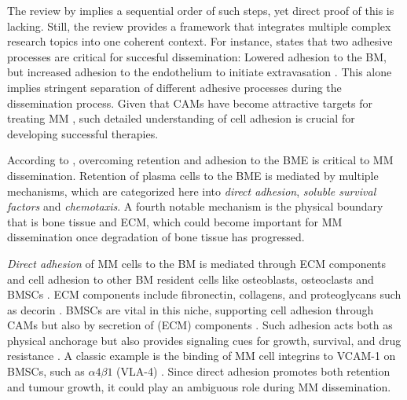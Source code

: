 The review by \citet{zeissigTumourDisseminationMultiple2020} implies a
sequential order of such steps, yet direct proof of this is lacking. Still, the
review provides a framework that integrates multiple complex research topics
into one coherent context. For instance,
\citet{zeissigTumourDisseminationMultiple2020} states that two adhesive
processes are critical for succesful dissemination: Lowered adhesion to the \ac{BM},
but increased adhesion to the endothelium to initiate extravasation
\cite{asosinghUniquePathwayHoming2001a,
    mrozikTherapeuticTargetingNcadherin2015}. This alone implies stringent
separation of different adhesive processes during the dissemination process.
Given that \acp{CAM} have become attractive targets for
treating \ac{MM} \cite{bouzerdanAdhesionMoleculesMultiple2022,
    katzAdhesionMoleculesLifelines2010}, such detailed understanding of cell
adhesion is crucial for developing successful therapies.


%
\label{sec:intro_myeloma_retention}%
According to \citet{zeissigTumourDisseminationMultiple2020}, overcoming
retention and adhesion to the BME is critical to \ac{MM} dissemination. Retention of
plasma cells to the BME is mediated by multiple mechanisms, which are
categorized here into \emph{direct adhesion}, \emph{soluble survival factors}
and \emph{chemotaxis}. A fourth notable mechanism is the physical boundary that
is bone tissue and \ac{ECM}, which could become important for
\ac{MM} dissemination once degradation of bone tissue has progressed.

\emph{Direct adhesion} of \ac{MM} cells to the \ac{BM} is mediated through
\ac{ECM} components and cell adhesion to other \ac{BM} resident cells like
osteoblasts, osteoclasts and \acp{BMSC} \cite{teohINTERACTIONTUMORHOST1997,
    bouzerdanAdhesionMoleculesMultiple2022}. \ac{ECM} components include
fibronectin, collagens, and proteoglycans such as decorin
\cite{huDecorinmediatedSuppressionTumorigenesis2021,
    huangHigherDecorinLevels2015, katzAdhesionMoleculesLifelines2010,
    kiblerAdhesiveInteractionsHuman1998}. \acp{BMSC} are vital in this niche,
supporting cell adhesion through \acp{CAM} but also by secretion of (\ac{ECM})
components \cite{katzAdhesionMoleculesLifelines2010}. Such adhesion acts both as
physical anchorage but also provides signaling cues for growth, survival, and
drug resistance \cite{chenContributionBoneMarrow2020}. A classic example is the
binding of \ac{MM} cell integrins to VCAM-1 on \acp{BMSC}, such as $\alpha4\beta1$ (VLA-4)
\cite{bouzerdanAdhesionMoleculesMultiple2022}. Since direct adhesion promotes
both retention and tumour growth, it could play an ambiguous role during \ac{MM}
dissemination.


